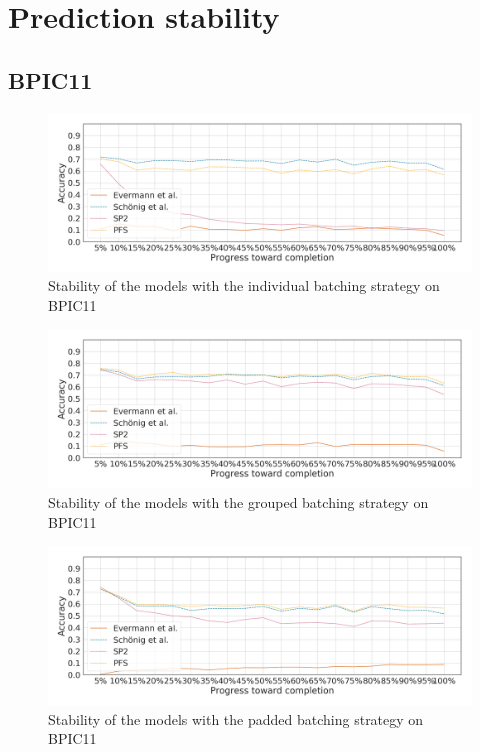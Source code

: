 \chapter{Prediction stability}
\label{appendix:evaluation-measurements}
\section*{BPIC11}
\begin{figure}[!htb]
    \centering
    \includegraphics[width=\textwidth]{gfx/bpic2011/individual_stability.png}
    \caption{Stability of the models with the individual batching strategy on BPIC11}
    \label{fig:bpic11-individual-stability}
\end{figure}
\begin{figure}[!htb]
    \centering
    \includegraphics[width=\textwidth]{gfx/bpic2011/grouped_stability.png}
    \caption{Stability of the models with the grouped batching strategy on BPIC11}
    \label{fig:bpic11-grouped-stability}
\end{figure}
\begin{figure}[!htb]
    \centering
    \includegraphics[width=\textwidth]{gfx/bpic2011/padded_stability.png}
    \caption{Stability of the models with the padded batching strategy on BPIC11}
    \label{fig:bpic11-padded-stability}
\end{figure}
